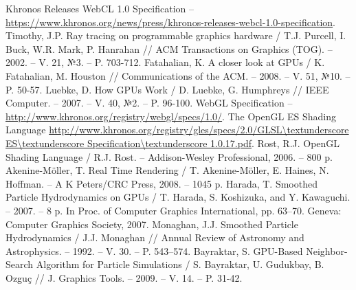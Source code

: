 \documentclass[a4paper,utf8,14pt,russian,nocolumnsxix,nocolumnxxxii,nocolumnxxxi,hpadding=10mm]{eskdtext}
\begin{document}
  \linespread{1.0} %
  \selectfont
  \maketitle
  \maketitle
  \linespread{1.35} %
  \selectfont
  
  \newpage
  \renewcommand{\contentsname}{Оглавление}
  \tableofcontents 
  
  
  
  
   
  \newpage

  \renewcommand\refname{Библиографический список}
  
  \begin{thebibliography}{}
     Khronos Releases WebCL 1.0 Specification -- \url{https://www.khronos.org/news/press/khronos-releases-webcl-1.0-specification}.
     Timothy, J.P. Ray tracing on programmable graphics hardware / T.J. Purcell, I. Buck, W.R. Mark, P. Hanrahan // ACM Transactions on Graphics (TOG). -- 2002. -- V. 21, №3. -- P. 703-712.
     Fatahalian, K. A closer look at GPUs / K. Fatahalian, M. Houston // Communications of the ACM. -- 2008. -- V. 51, №10. -- P. 50-57.
     Luebke, D. How GPUs Work / D. Luebke, G. Humphreys // IEEE Computer. -- 2007. -- V. 40, №2. -- P. 96-100.
     WebGL Specification -- \url{http://www.khronos.org/registry/webgl/specs/1.0/}.
     The OpenGL ES Shading Language \url{http://www.khronos.org/registry/gles/specs/2.0/GLSL\textunderscore ES\textunderscore Specification\textunderscore 1.0.17.pdf}.
     Rost, R.J. OpenGL Shading Language / R.J. Rost. -- Addison-Wesley Professional, 2006. -- 800 p.
     Akenine-Möller, T. Real Time Rendering / T. Akenine-Möller, E. Haines, N. Hoffman. -- A K Peters/CRC Press, 2008. -- 1045 p.
     Harada, T. Smoothed Particle Hydrodynamics on GPUs / T. Harada, S. Koshizuka, and Y. Kawaguchi. -- 2007. -- 8 p.
      In Proc. of Computer Graphics International, pp. 63–70. Geneva: Computer Graphics Society, 2007.
     Monaghan, J.J. Smoothed Particle Hydrodynamics / J.J. Monaghan // Annual Review of Astronomy and Astrophysics. -- 1992. -- V. 30. -- P. 543–574.
     Bayraktar, S. GPU-Based Neighbor-Search Algorithm for Particle Simulations / S. Bayraktar, U. Gudukbay, B. Ozguç // J. Graphics Tools. -- 2009. -- V. 14. -- P. 31-42.
  \end{thebibliography}

  
\end{document}
